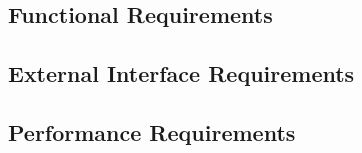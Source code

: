 \subsection{Functional Requirements}
\subsection{External Interface Requirements}
\subsection{Performance Requirements}
